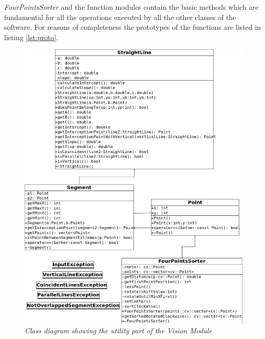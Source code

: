 		\emph{FourPointsSorter} and the function modules contain the basic methods which are fundamental for all the operations executed by all the other classes of the software.
		For reasons of completeness the prototypes of the functions are listed in listing \ref{lst:proto}.
	

		
			
		
		\begin{figure}[h]
		  \begin{center} 
		    	
		       \includegraphics[width=\textwidth*\real{0.81}]{images/appendix/utility.png}
		    
		  \end{center} 
		  \caption{\textit{Class diagram showing the utility part of the Vision Module}}  
		  \label{fig:impl_utility}
	 	\end{figure}	
